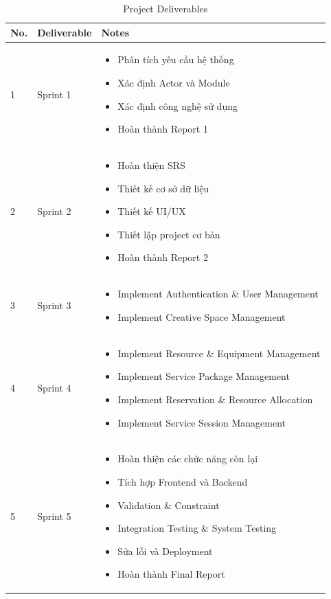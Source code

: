 \begin{table}[H]
	\centering
	\small
	\caption{Project Deliverables}
	\begin{tabularx}{\textwidth}{|L{1.2cm}|L{2.5cm}|Y|}
		\hline
		\textbf{No.} & \textbf{Deliverable} & \textbf{Notes} \\ \hline
		
		1 & Sprint 1 &
		\begin{itemize}
			\item Phân tích yêu cầu hệ thống
			\item Xác định Actor và Module
			\item Xác định công nghệ sử dụng
			\item Hoàn thành Report 1
		\end{itemize}
		\\ \hline
		
		2 & Sprint 2 &
		\begin{itemize}
			\item Hoàn thiện SRS
			\item Thiết kế cơ sở dữ liệu
			\item Thiết kế UI/UX
			\item Thiết lập project cơ bản
			\item Hoàn thành Report 2
		\end{itemize}
		\\ \hline
		
		3 & Sprint 3 &
		\begin{itemize}
			\item Implement Authentication \& User Management
			\item Implement Creative Space Management
		\end{itemize}
		\\ \hline
		
		4 & Sprint 4 &
		\begin{itemize}
			\item Implement Resource \& Equipment Management
			\item Implement Service Package Management
			\item Implement Reservation \& Resource Allocation
			\item Implement Service Session Management
		\end{itemize}
		\\ \hline
		
		5 & Sprint 5 &
		\begin{itemize}
			\item Hoàn thiện các chức năng còn lại
			\item Tích hợp Frontend và Backend
			\item Validation \& Constraint
			\item Integration Testing \& System Testing
			\item Sửa lỗi và Deployment
			\item Hoàn thành Final Report
		\end{itemize}
		\\ \hline
		
	\end{tabularx}
\end{table}


